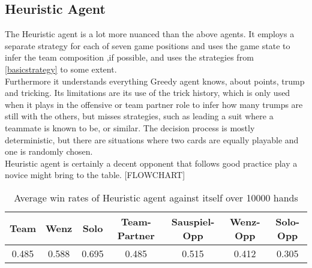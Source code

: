 \subsection{Heuristic Agent}
The Heuristic agent is a lot more nuanced than the above agents.
It employs a separate strategy for each of seven game positions and uses the game state to infer the team composition
,if possible, and uses the strategies from \ref{basicstrategy} to some extent.\\
Furthermore it understands everything Greedy agent knows, about points, trump and tricking.
Its limitations are its use of the trick history, which is only used when it plays in the offensive or team partner
role to infer how many trumps are still with the others, but misses strategies, such as leading a suit where a
teammate is known to be, or similar.
The decision process is mostly deterministic, but there are situations where two cards are equally playable and one is
randomly chosen.\\
Heuristic agent is certainly a decent opponent that follows good practice play a novice might bring to the table.
[FLOWCHART]
\begin{table}[!h]
    \centering
    \begin{tabular}{ccccccc}
        \toprule
        Team  & Wenz  & Solo  & Team-Partner & Sauspiel-Opp & Wenz-Opp & Solo-Opp \\
        \midrule
        0.485 & 0.588 & 0.695 & 0.485        & 0.515        & 0.412    & 0.305    \\
        \bottomrule
    \end{tabular}
    \caption{Average win rates of Heuristic agent against itself over 10000 hands}
    \label{tab:win ratesHeu}
\end{table}


